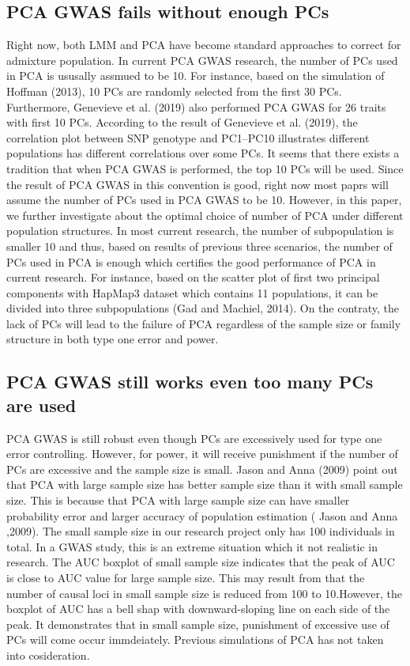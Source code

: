 \documentclass[12pt]{article}
\begin{document}
\subsection{PCA GWAS fails without enough PCs}
Right now, both LMM and PCA have become standard approaches to correct for admixture population. In current PCA GWAS research, the number of PCs used in PCA is ususally assmued to be 10. For instance, based on the simulation of Hoffman (2013), 10 PCs are randomly selected from the first 30 PCs. Furthermore, Genevieve et al. (2019) also performed PCA GWAS for 26 traits with first 10 PCs. According to the result of Genevieve et al. (2019), the correlation plot between SNP genotype and PC1–PC10 illustrates different populations has different correlations over some PCs. It seems that there exists a tradition that when PCA GWAS is performed, the top 10 PCs will be used. Since the result of PCA GWAS in this convention is good, right now most paprs will assume the number of PCs used in PCA GWAS to be 10. However, in this paper, we further investigate about the optimal choice of number of PCA under different population structures. In most current research, the number of subpopulation is smaller 10 and thus, based on results of previous three scenarios, the number of PCs used in PCA is enough which certifies the good performance of PCA  in current research. For instance, based on the scatter plot of first two principal components with HapMap3 dataset which contains 11 populations, it can be divided into three subpopulations (Gad and Machiel, 2014). On the contraty, the lack of PCs will lead to the failure of PCA regardless of the sample size or family structure in both type one error and power. 


\subsection{PCA GWAS still works even too many PCs are used}
PCA GWAS is still robust even though PCs are excessively used for type one error controlling. However, for power, it will receive punishment if the number of PCs are excessive and the sample size is small. Jason and Anna (2009) point out that PCA with large sample size has better sample size than it with small sample size. This is because that PCA with large sample size can have smaller probability error and larger accuracy of population estimation ( Jason and Anna ,2009). The small sample size in our research project only has 100 individuals in total. In a GWAS study, this is an extreme situation which it not realistic in research. The AUC boxplot of small sample size indicates that the peak of AUC is close to AUC value for large sample size. This may result from that the number of causal loci in small sample size is reduced from 100 to 10.However, the boxplot of AUC has a bell shap with downward-sloping line on each side of the peak. It demonstrates that in small sample size, punishment of excessive use of PCs will come occur immdeiately. Previous simulations of PCA has not taken into cosideration. 
\end{document}
